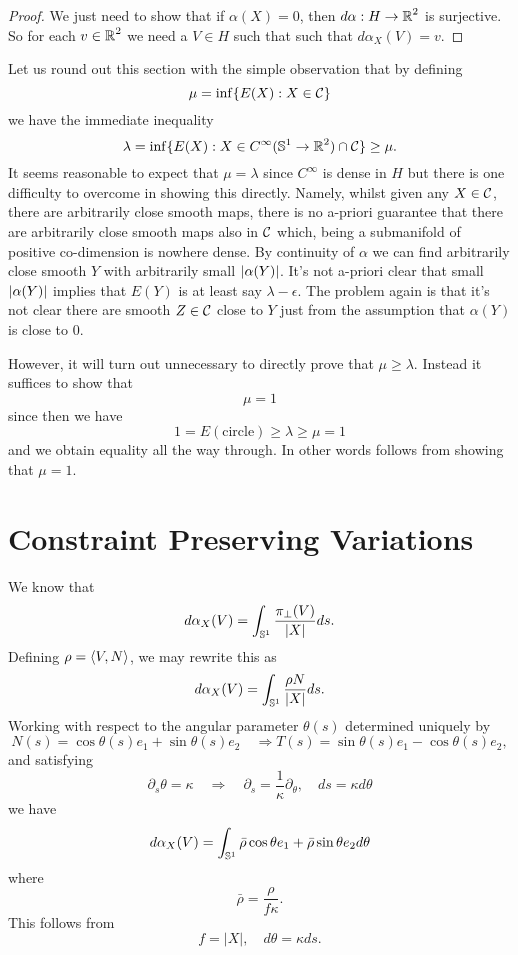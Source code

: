 \documentclass[12pt]{article}
\begin{document}
\begin{proof}
We just need to show that if \(\alpha(X) = 0\), then \(d\alpha : H \to \operatorname{\mathbb{R}}^2\) is surjective. So for each \(v \in \operatorname{\mathbb{R}}^2\) we need a \(V \in H\) such that such that \(d\alpha_X (V) = v\).
\end{proof}

Let us round out this section with the simple observation that by defining
\begin{equation}
\label{eq:mu}
\mu = \inf\{E(X) : X \in \operatorname{\mathcal{C}}\}
\end{equation}
we have the immediate inequality
\[
\lambda = \inf\{E(X) : X \in C^{\infty}(\operatorname{\mathbb{S}^1} \to \operatorname{\mathbb{R}}^2) \cap \operatorname{\mathcal{C}}\} \geq \mu.
\]
It seems reasonable to expect that \(\mu = \lambda\) since \(C^{\infty}\) is dense in \(H\) but there is one difficulty to overcome in showing this directly. Namely, whilst given any \(X \in \operatorname{\mathcal{C}}\), there are arbitrarily close smooth maps, there is no a-priori guarantee that there are arbitrarily close smooth maps also in \(\operatorname{\mathcal{C}}\) which, being a submanifold of positive co-dimension is nowhere dense. By continuity of \(\alpha\) we can find arbitrarily close smooth \(Y\) with arbitrarily small \(\left|{\alpha(Y)}\right|\). It's not a-priori clear that small \(\left|{\alpha(Y)}\right|\) implies that \(E(Y)\) is at least say \(\lambda - \epsilon\). The problem again is that it's not clear there are smooth \(Z \in \operatorname{\mathcal{C}}\) close to \(Y\) just from the assumption that \(\alpha(Y)\) is close to \(0\).

However, it will turn out unnecessary to directly prove that \(\mu \geq \lambda\). Instead it suffices to show that
\[
\mu = 1
\]
since then we have
\[
1 = E(\text{circle}) \geq \lambda \geq \mu = 1
\]
and we obtain equality all the way through. In other words  follows from showing that \(\mu = 1\).

\section{Constraint Preserving Variations}

We know that
\[
d\alpha_X (V) = \int_{\operatorname{\mathbb{S}^1}} \frac{\pi_{\perp} (V)}{|X|} ds.
\]
Defining \(\rho = \left\langle{V},{N}\right\rangle\), we may rewrite this as
\[
d\alpha_X (V) = \int_{\operatorname{\mathbb{S}^1}} \frac{\rho N}{|X|} ds.
\]
Working with respect to the angular parameter \(\theta(s)\) determined uniquely by
\[
N(s) = \cos \theta(s) e_1 + \sin \theta(s) e_2 \quad \Rightarrow T(s) = \sin \theta(s) e_1 - \cos \theta(s) e_2,
\]
and satisfying
\[
\partial_s \theta = \kappa \quad \Rightarrow \quad \partial_s = \frac{1}{\kappa} \partial_{\theta}, \quad ds = \kappa d\theta
\]
we have
\[
d\alpha_X (V) = \int_{\operatorname{\mathbb{S}^1}} \bar{\rho} \cos\theta e_1 + \bar{\rho} \sin\theta e_2 d\theta
\]
where
\[
\bar{\rho} = \frac{\rho}{f \kappa}.
\]
This follows from
\[
f = |X|, \quad d\theta = \kappa ds.
\]
\end{document}
